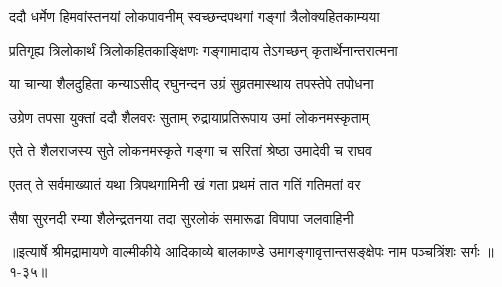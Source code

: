 \twolineshloka
{ददौ धर्मेण हिमवांस्तनयां लोकपावनीम्}
{स्वच्छन्दपथगां गङ्गां त्रैलोक्यहितकाम्यया} %

\twolineshloka
{प्रतिगृह्य त्रिलोकार्थं त्रिलोकहितकाङ्क्षिणः}
{गङ्गामादाय तेऽगच्छन् कृतार्थेनान्तरात्मना} %

\twolineshloka
{या चान्या शैलदुहिता कन्याऽसीद् रघुनन्दन}
{उग्रं सुव्रतमास्थाय तपस्तेपे तपोधना} %

\twolineshloka
{उग्रेण तपसा युक्तां ददौ शैलवरः सुताम्}
{रुद्रायाप्रतिरूपाय उमां लोकनमस्कृताम्} %

\twolineshloka
{एते ते शैलराजस्य सुते लोकनमस्कृते}
{गङ्गा च सरितां श्रेष्ठा उमादेवी च राघव} %

\twolineshloka
{एतत् ते सर्वमाख्यातं यथा त्रिपथगामिनी}
{खं गता प्रथमं तात गतिं गतिमतां वर} %

\twolineshloka
{सैषा सुरनदी रम्या शैलेन्द्रतनया तदा}
{सुरलोकं समारूढा विपापा जलवाहिनी} %


॥इत्यार्षे श्रीमद्रामायणे वाल्मीकीये आदिकाव्ये बालकाण्डे उमागङ्गावृत्तान्तसङ्क्षेपः नाम पञ्चत्रिंशः सर्गः ॥१-३५॥
